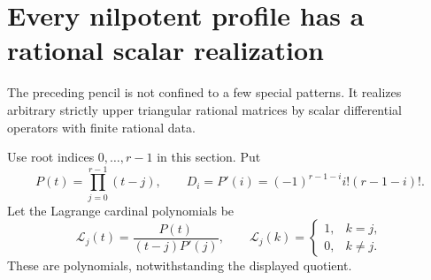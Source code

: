 \documentclass[11pt,a4paper]{article}
\numberwithin{equation}{section}
\theoremstyle{definition}
\theoremstyle{remark}
\theoremstyle{definition}
\begin{document}
\section{Every nilpotent profile has a rational scalar realization}
\label{sec:realization}
The preceding pencil is not confined to a few special patterns. It realizes arbitrary strictly upper triangular rational matrices by scalar differential operators with finite rational data.

Use root indices $0,\ldots,r-1$ in this section. Put
\begin{equation}
 P(t)=\prod_{j=0}^{r-1}(t-j),\qquad
 D_i=P'(i)=(-1)^{r-1-i}i!(r-1-i)!.
 \label{eq:integer-indicial}
\end{equation}
Let the Lagrange cardinal polynomials be
\begin{equation}
 \mathcal L_j(t)=\frac{P(t)}{(t-j)P'(j)},
 \qquad \mathcal L_j(k)=\begin{cases}1,&k=j,\\0,&k\ne j.
 \end{cases}
 \label{eq:lagrange}
\end{equation}
These are polynomials, notwithstanding the displayed quotient.
\end{document}
